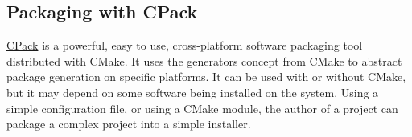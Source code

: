 \clearpage
\subsection{Packaging with CPack}

\href{https://cmake.org/cmake/help/book/mastering-cmake/chapter/Packaging\%20With\%20CPack.html}{CPack} is a powerful, easy to use, 
cross-platform software packaging tool distributed with CMake. 
It uses the generators concept from CMake to abstract package generation on specific platforms. 
It can be used with or without CMake, but it may depend on some software being installed on the system. 
Using a simple configuration file, or using a CMake module, the author of a project can package a complex project into a simple installer. 
